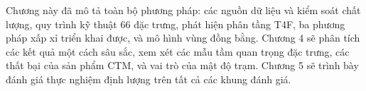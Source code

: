 Chương này đã mô tả toàn bộ phương pháp: các nguồn dữ liệu và kiểm soát chất lượng, quy trình kỹ thuật 66 đặc trưng, phát hiện phân tầng T4F, ba phương pháp xấp xỉ triển khai được, và mô hình vùng đồng bằng. Chương 4 sẽ phân tích các kết quả một cách sâu sắc, xem xét các mẫu tầm quan trọng đặc trưng, các thất bại của sản phẩm CTM, và vai trò của mật độ trạm. Chương 5 sẽ trình bày đánh giá thực nghiệm định lượng trên tất cả các khung đánh giá.
